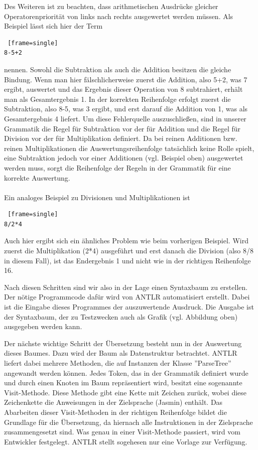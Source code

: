 Des Weiteren ist zu beachten, dass arithmetischen Ausdrücke gleicher Operatorenpriorität von links  nach rechts ausgewertet werden müssen. Als Beispiel lässt sich hier der Term 
\begin{lstlisting} [frame=single]
8-5+2
\end{lstlisting}
nennen. Sowohl die Subtraktion als auch die Addition besitzen die gleiche Bindung. Wenn man hier fälschlicherweise zuerst die Addition, also 5+2, was 7 ergibt, auswertet und das Ergebnis dieser Operation von 8 subtrahiert, erhält man als Gesamtergebnis 1. 
In der korrekten Reihenfolge erfolgt zuerst die Subtraktion, also 8-5, was 3 ergibt, und erst darauf die Addition von 1, was als Gesamtergebnis 4 liefert. 
Um diese Fehlerquelle auszuschließen, sind in unserer Grammatik die Regel für Subtraktion vor der für Addition und die Regel für Division vor der für Multiplikation definiert. Da bei reinen Additionen bzw. reinen Multiplikationen die Auswertungsreihenfolge tatsächlich keine Rolle spielt, eine Subtraktion jedoch vor einer Additionen (vgl. Beispiel oben) ausgewertet werden muss, sorgt die Reihenfolge der Regeln in der Grammatik für eine korrekte Auswertung.
\\\\
\linebreak
Ein analoges Beispiel zu Divisionen und Multiplikationen ist
\begin{lstlisting} [frame=single]
8/2*4
\end{lstlisting}
Auch hier ergibt sich ein ähnliches Problem wie beim vorherigen Beispiel. Wird zuerst die Multiplikation (2*4) ausgeführt und erst danach die Division (also 8/8 in diesem Fall), ist das Endergebnis 1 und nicht wie in der richtigen Reihenfolge 16.

Nach diesen Schritten sind wir also in der Lage einen Syntaxbaum zu erstellen. Der nötige Programmcode dafür wird von ANTLR automatisiert erstellt. Dabei ist die Eingabe dieses Programmes der auszuwertende Ausdruck. Die Ausgabe ist der Syntaxbaum, der zu Testzwecken auch als Grafik (vgl. Abbildung oben) ausgegeben werden kann. 

Der nächste wichtige Schritt der Übersetzung besteht nun in der Auswertung dieses Baumes. Dazu wird der Baum als Datenstruktur betrachtet. ANTLR liefert dabei mehrere Methoden, die auf Instanzen der Klasse ''ParseTree'' angewandt werden können. 
Jedes Token, das in der Grammatik definiert wurde und durch einen Knoten im Baum repräsentiert wird, besitzt eine sogenannte Visit-Methode. Diese Methode gibt eine Kette mit Zeichen zurück, wobei diese Zeichenkette die Anweisungen in der Zielsprache (Jasmin) enthält. Das Abarbeiten dieser Visit-Methoden in der richtigen Reihenfolge bildet die Grundlage für die Übersetzung, da hiernach alle Instruktionen in der Zielsprache zusammengesetzt sind. Was genau in einer Visit-Methode passiert, wird vom Entwickler festgelegt. ANTLR stellt sogehesen nur eine Vorlage zur Verfügung.

